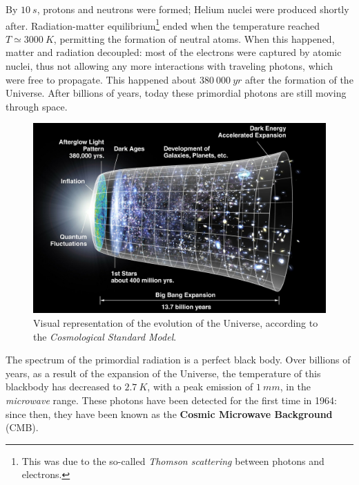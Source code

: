 \documentclass[12pt,a4paper,final]{book}			%
\begin{document}
			By $10~\unit{s}$, protons and neutrons were formed; Helium nuclei were produced shortly after. Radiation-matter equilibrium\footnote{This was due to the so-called \textit{Thomson scattering} between photons and electrons.} ended when the temperature reached $T \simeq 3000~\unit{K}$, permitting the formation of neutral atoms. When this happened, matter and radiation decoupled: most of the electrons were captured by atomic nuclei, thus not allowing any more interactions with traveling photons, which were free to propagate. This happened about $380~000~\unit{yr}$ after the formation of the Universe. After billions of years, today these primordial photons are still moving through space.
			\begin{figure}[h!]
				\centering
				\includegraphics[scale=0.3]{figures/universe_history.jpg}
				\caption{Visual representation of the evolution of the Universe, according to the \textit{Cosmological Standard Model}.}
				\label{universe_history}
			\end{figure}						
			
			The spectrum of the primordial radiation is a perfect black body. 
			 Over billions of years, as a result of the expansion of the Universe, the temperature of this blackbody has decreased to $2.7~\unit{K}$, with a peak emission of $1~\unit{mm}$, in the \textit{microwave} range. These photons have been detected for the first time in 1964: since then, they have been known as the \textbf{Cosmic Microwave Background} (CMB). 
			 
\end{document}
